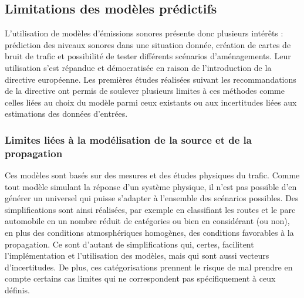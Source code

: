 \subsection{Limitations des modèles prédictifs}

L'utilisation de modèles d'émissions sonores présente donc plusieurs intérêts : prédiction des niveaux sonores dans une situation donnée, création de cartes de bruit de trafic et possibilité de tester différents scénarios d'aménagements. Leur utilisation s'est répandue et démocratisée en raison de l'introduction de la directive européenne. Les premières études réalisées suivant les recommandations de la directive ont permis de soulever plusieurs limites à ces méthodes comme celles liées au choix du modèle parmi ceux existants ou aux incertitudes liées aux estimations des données d'entrées.

\subsubsection{Limites liées à la modélisation de la source et de la propagation}

Ces modèles sont basés sur des mesures et des études physiques du trafic. Comme tout modèle simulant la réponse d'un système physique, il n'est pas possible d'en générer un universel qui puisse s'adapter à l'ensemble des scénarios possibles. Des simplifications sont ainsi réalisées, par exemple en classifiant les routes et le parc automobile en un nombre réduit de catégories ou bien en considérant (ou non), en plus des conditions atmosphériques homogènes, des conditions favorables à la propagation. Ce sont d'autant de simplifications qui, certes, facilitent l'implémentation et l'utilisation des modèles, mais qui sont aussi vecteurs d'incertitudes. De plus, ces catégorisations prennent le risque de mal prendre en compte certains cas limites qui ne correspondent pas spécifiquement à ceux définis.

